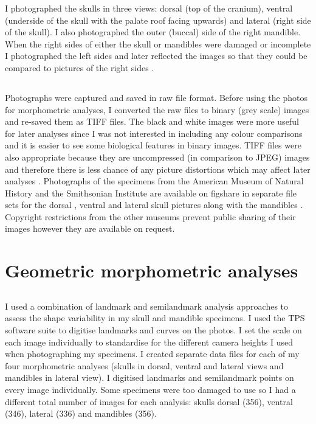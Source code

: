 	I photographed the skulls in three views: dorsal (top of the cranium), ventral (underside of the skull with the palate roof facing upwards) and lateral (right side of the skull). I also photographed the outer (buccal) side of the right mandible. When the right sides of either the skull or mandibles were damaged or incomplete I photographed the left sides and later reflected the images so that they could be compared to pictures of the right sides \citep[e.g.][]{Barrow2008}.


\subsection{}
	Photographs were captured and saved in raw file format. Before using the photos for morphometric analyses, I converted the raw files to binary (grey scale) images and re-saved them as TIFF files. The black and white images were more useful for later analyses since I was not interested in including any colour comparisons and it is easier to see some biological features in binary images. TIFF files were also appropriate because they are uncompressed (in comparison to JPEG) images and therefore there is less chance of any picture distortions which may affect later analyses \citep{RHOI2013}.
	Photographs of the specimens from the American Museum of Natural History and the Smithsonian Institute are available on figshare in separate file sets for the dorsal \citep{Finlay2013d}, ventral \citep{Finlay2013v} and lateral \citep{Finlay2013l} skull pictures along with the mandibles \citep{Finlay2013m}. Copyright restrictions from the other museums prevent public sharing of their images however they are available on request.
	


\section{Geometric morphometric analyses}
\label{sect:morphometrics}

\subsection{}


	I used a combination of landmark and semilandmark analysis approaches to assess the shape variability in my skull and mandible specimens.  I used the TPS software suite \citep{Rohlf2013} to digitise landmarks and curves on the photos. I set the scale on each image individually to standardise for the different camera heights I used when photographing my specimens. I created separate data files for each of my four morphometric analyses (skulls in dorsal, ventral and lateral views and mandibles in lateral view). I digitised landmarks and semilandmark points on every image individually. Some specimens were too damaged to use so I had a different total number of images for each analysis: skulls dorsal (356), ventral (346), lateral (336) and mandibles (356).

